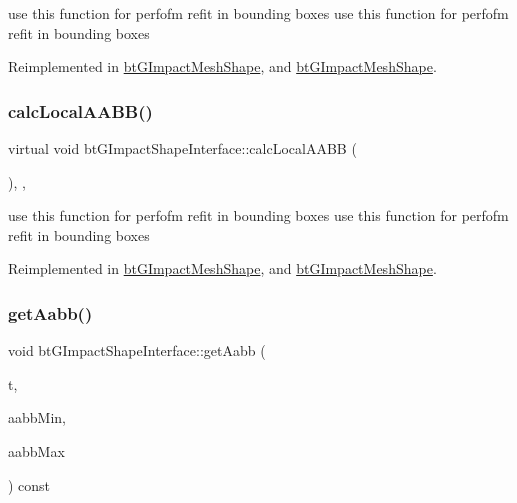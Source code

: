 use this function for perfofm refit in bounding boxes use this function for perfofm refit in bounding boxes 

Reimplemented in \hyperlink{classbtGImpactMeshShape_aa9273d609f4872c7a4c05e9873edbda8}{bt\+G\+Impact\+Mesh\+Shape}, and \hyperlink{classbtGImpactMeshShape_aa9273d609f4872c7a4c05e9873edbda8}{bt\+G\+Impact\+Mesh\+Shape}.

\mbox{\label{classbtGImpactShapeInterface_a1712a4613e20aa9249514dcd97f0a086}} 
\subsubsection{\texorpdfstring{calc\+Local\+A\+A\+B\+B()}{calcLocalAABB()}\hspace{0.1cm}{\footnotesize\ttfamily [2/2]}}
{\footnotesize\ttfamily virtual void bt\+G\+Impact\+Shape\+Interface\+::calc\+Local\+A\+A\+BB (\begin{DoxyParamCaption}{ }\end{DoxyParamCaption})\hspace{0.3cm}{\ttfamily [inline]}, {\ttfamily [protected]}, {\ttfamily [virtual]}}

use this function for perfofm refit in bounding boxes use this function for perfofm refit in bounding boxes 

Reimplemented in \hyperlink{classbtGImpactMeshShape_aa9273d609f4872c7a4c05e9873edbda8}{bt\+G\+Impact\+Mesh\+Shape}, and \hyperlink{classbtGImpactMeshShape_aa9273d609f4872c7a4c05e9873edbda8}{bt\+G\+Impact\+Mesh\+Shape}.

\mbox{\label{classbtGImpactShapeInterface_a03644dc230664957e43ed49b4a319d64}} 
\subsubsection{\texorpdfstring{get\+Aabb()}{getAabb()}\hspace{0.1cm}{\footnotesize\ttfamily [1/2]}}
{\footnotesize\ttfamily void bt\+G\+Impact\+Shape\+Interface\+::get\+Aabb (\begin{DoxyParamCaption}\item[{const bt\+Transform \&}]{t,  }\item[{bt\+Vector3 \&}]{aabb\+Min,  }\item[{bt\+Vector3 \&}]{aabb\+Max }\end{DoxyParamCaption}) const\hspace{0.3cm}{\ttfamily [inline]}}



